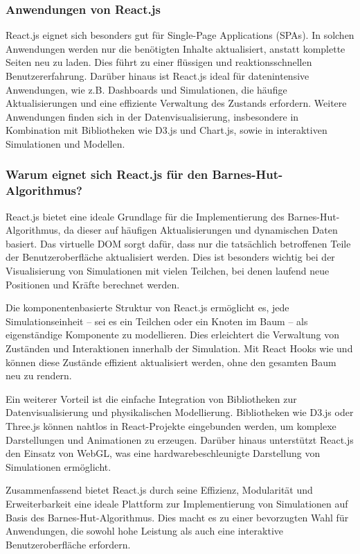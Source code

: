 \documentclass[a4paper,12pt,twoside]{article}
\begin{document}
\subsubsection{Anwendungen von React.js}
React.js eignet sich besonders gut für Single-Page Applications (SPAs). In solchen Anwendungen werden nur die benötigten Inhalte aktualisiert, anstatt komplette Seiten neu zu laden. Dies führt zu einer flüssigen und reaktionsschnellen Benutzererfahrung. Darüber hinaus ist React.js ideal für datenintensive Anwendungen, wie z.B. Dashboards und Simulationen, die häufige Aktualisierungen und eine effiziente Verwaltung des Zustands erfordern. Weitere Anwendungen finden sich in der Datenvisualisierung, insbesondere in Kombination mit Bibliotheken wie D3.js und Chart.js, sowie in interaktiven Simulationen und Modellen.

\subsubsection{Warum eignet sich React.js für den Barnes-Hut-Algorithmus?}
React.js bietet eine ideale Grundlage für die Implementierung des Barnes-Hut-Algorithmus, da dieser auf häufigen Aktualisierungen und dynamischen Daten basiert. Das virtuelle DOM sorgt dafür, dass nur die tatsächlich betroffenen Teile der Benutzeroberfläche aktualisiert werden. Dies ist besonders wichtig bei der Visualisierung von Simulationen mit vielen Teilchen, bei denen laufend neue Positionen und Kräfte berechnet werden.

Die komponentenbasierte Struktur von React.js ermöglicht es, jede Simulationseinheit -- sei es ein Teilchen oder ein Knoten im Baum -- als eigenständige Komponente zu modellieren. Dies erleichtert die Verwaltung von Zuständen und Interaktionen innerhalb der Simulation. Mit React Hooks wie  und  können diese Zustände effizient aktualisiert werden, ohne den gesamten Baum neu zu rendern.

Ein weiterer Vorteil ist die einfache Integration von Bibliotheken zur Datenvisualisierung und physikalischen Modellierung. Bibliotheken wie D3.js oder Three.js können nahtlos in React-Projekte eingebunden werden, um komplexe Darstellungen und Animationen zu erzeugen. Darüber hinaus unterstützt React.js den Einsatz von WebGL, was eine hardwarebeschleunigte Darstellung von Simulationen ermöglicht.

Zusammenfassend bietet React.js durch seine Effizienz, Modularität und Erweiterbarkeit eine ideale Plattform zur Implementierung von Simulationen auf Basis des Barnes-Hut-Algorithmus. Dies macht es zu einer bevorzugten Wahl für Anwendungen, die sowohl hohe Leistung als auch eine interaktive Benutzeroberfläche erfordern.
\end{document}
